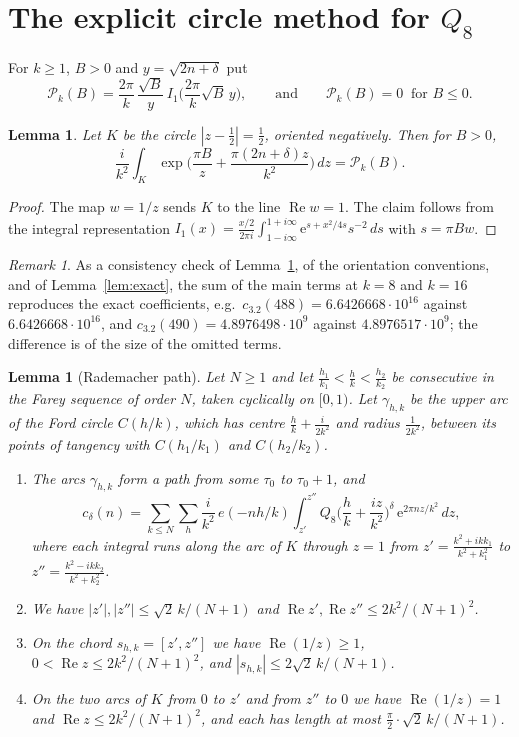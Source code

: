 \documentclass[11pt]{amsart}
\newtheorem{lemma}[theorem]{Lemma}
\theoremstyle{remark}
\newtheorem{remark}[theorem]{Remark}
\theoremstyle{definition}
\newcommand{\cP}{\mathcal P}
\newcommand{\Rea}{\operatorname{Re}}
\newcommand{\e}{\mathrm e}
\begin{document}
\section{The explicit circle method for $Q_8$}\label{sec:circle}

For $k\ge1$, $B>0$ and $y=\sqrt{2n+\delta}$ put
\[
\cP_k(B)=\frac{2\pi}k\,\frac{\sqrt B}{y}\,I_1\Big(\frac{2\pi}k\sqrt B\,y\Big),\qquad\text{and}\qquad \cP_k(B)=0\ \text{ for } B\le0 .
\]

\begin{lemma}\label{lem:bessel}
Let $K$ be the circle $|z-\frac12|=\frac12$, oriented negatively. Then for $B>0$,
\[
\frac i{k^2}\int_K\exp\Big(\frac{\pi B}z+\frac{\pi(2n+\delta)z}{k^2}\Big)\,dz=\cP_k(B).
\]
\end{lemma}

\begin{proof}
The map $w=1/z$ sends $K$ to the line $\Rea w=1$. The claim follows from the integral representation $I_1(x)=\frac{x/2}{2\pi i}\int_{1-i\infty}^{1+i\infty}\e^{s+x^2/4s}s^{-2}\,ds$ with $s=\pi Bw$.
\end{proof}

\begin{remark}
As a consistency check of Lemma~\ref{lem:bessel}, of the orientation conventions, and of Lemma~\ref{lem:exact}, the sum of the main terms at $k=8$ and $k=16$ reproduces the exact coefficients, e.g.\ $c_{3.2}(488)=6.6426668\cdot10^{16}$ against $6.6426668\cdot10^{16}$, and $c_{3.2}(490)=4.8976498\cdot10^{9}$ against $4.8976517\cdot10^{9}$; the difference is of the size of the omitted terms.
\end{remark}

\begin{lemma}[Rademacher path]\label{lem:farey}
Let $N\ge1$ and let $\frac{h_1}{k_1}<\frac hk<\frac{h_2}{k_2}$ be consecutive in the Farey sequence of order $N$, taken cyclically on $[0,1)$. Let $\gamma_{h,k}$ be the upper arc of the Ford circle $C(h/k)$, which has centre $\frac hk+\frac i{2k^2}$ and radius $\frac1{2k^2}$, between its points of tangency with $C(h_1/k_1)$ and $C(h_2/k_2)$.
\begin{enumerate}[label=(\alph*),leftmargin=2em]
\item The arcs $\gamma_{h,k}$ form a path from some $\tau_0$ to $\tau_0+1$, and
\[
c_\delta(n)=\sum_{k\le N}\sum_h\frac i{k^2}\,e(-nh/k)\int_{z'}^{z''}Q_8\Big(\frac hk+\frac{iz}{k^2}\Big)^\delta\,\e^{2\pi nz/k^2}\,dz,
\]
where each integral runs along the arc of $K$ through $z=1$ from $z'=\frac{k^2+ikk_1}{k^2+k_1^2}$ to $z''=\frac{k^2-ikk_2}{k^2+k_2^2}$.
\item We have $|z'|,|z''|\le\sqrt2\,k/(N+1)$ and $\Rea z',\Rea z''\le2k^2/(N+1)^2$.
\item On the chord $s_{h,k}=[z',z'']$ we have $\Rea(1/z)\ge1$, $0<\Rea z\le2k^2/(N+1)^2$, and $|s_{h,k}|\le2\sqrt2\,k/(N+1)$.
\item On the two arcs of $K$ from $0$ to $z'$ and from $z''$ to $0$ we have $\Rea(1/z)=1$ and $\Rea z\le2k^2/(N+1)^2$, and each has length at most $\frac\pi2\cdot\sqrt2\,k/(N+1)$.
\end{enumerate}
\end{lemma}
\end{document}
